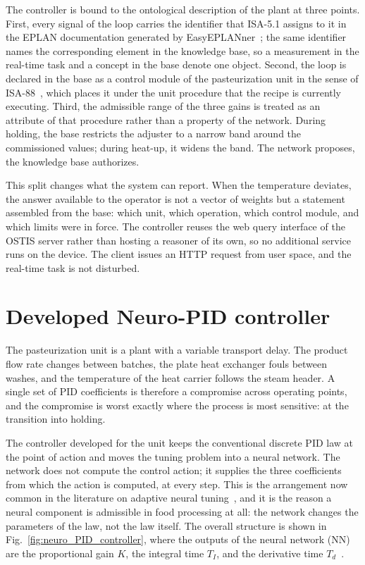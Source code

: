 The controller is bound to the ontological description of the plant at three
points. First, every signal of the loop carries the identifier that ISA-5.1
assigns to it in the EPLAN documentation generated by
EasyEPLANner~\cite{EasyEPLANner}; the same identifier names the corresponding
element in the knowledge base, so a measurement in the real-time task and a
concept in the base denote one object. Second, the loop is declared in the base
as a control module of the pasteurization unit in the sense of
ISA-88~\cite{ISA88}, which places it under the unit procedure that the recipe is
currently executing. Third, the admissible range of the three gains is treated
as an attribute of that procedure rather than a property of the network. During
holding, the base restricts the adjuster to a narrow band around the
commissioned values; during heat-up, it widens the band. The network proposes,
the knowledge base authorizes.

This split changes what the system can report. When the temperature deviates,
the answer available to the operator is not a vector of weights but a statement
assembled from the base: which unit, which operation, which control module, and
which limits were in force. The controller reuses the web query interface of the
OSTIS server rather than hosting a reasoner of its own, so no additional service
runs on the device. The client issues an HTTP request from user space, and the
real-time task is not disturbed.

\section{Developed Neuro-PID controller}

The pasteurization unit is a plant with a variable transport delay. The product
flow rate changes between batches, the plate heat exchanger fouls between
washes, and the temperature of the heat carrier follows the steam header. A
single set of PID coefficients is therefore a compromise across operating
points, and the compromise is worst exactly where the process is most sensitive:
at the transition into holding.

The controller developed for the unit keeps the conventional discrete PID law at
the point of action and moves the tuning problem into a neural network. The
network does not compute the control action; it supplies the three coefficients
from which the action is computed, at every step. This is the arrangement now
common in the literature on adaptive neural
tuning~\cite{Almachi2025, Zribi2025, Ito2025pinn}, and it is the reason a neural
component is admissible in food processing at all: the network changes the
parameters of the law, not the law itself. The overall structure is shown in
Fig.~\ref{fig:neuro_PID_controller}, where the outputs of the neural network
(NN) are the proportional gain $K$, the integral time $T_I$, and the derivative
time $T_d$~\cite{ivaniuk2013neuro}.

